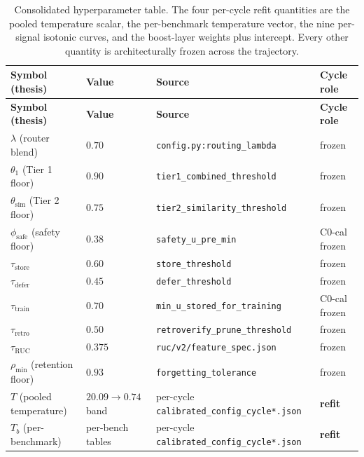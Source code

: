{\footnotesize
\setlength{\tabcolsep}{4pt}
\renewcommand{\arraystretch}{1.1}
\begin{longtable}{@{}p{4.0cm}p{3.8cm}p{4.0cm}p{2.6cm}@{}}
\caption[Consolidated hyperparameter table]{Consolidated hyperparameter table. The four per-cycle refit quantities are the pooled temperature scalar, the per-benchmark temperature vector, the nine per-signal isotonic curves, and the boost-layer weights plus intercept. Every other quantity is architecturally frozen across the trajectory.}
\label{tab:app-hyperparameters}\\
\toprule
\textbf{Symbol (thesis)} & \textbf{Value} & \textbf{Source} & \textbf{Cycle role} \\
\midrule
\endfirsthead
\toprule
\textbf{Symbol (thesis)} & \textbf{Value} & \textbf{Source} & \textbf{Cycle role} \\
\midrule
\endhead
\bottomrule
\endfoot
$\lambda$ (router blend)             & $0.70$ & \texttt{config.py:\allowbreak routing\_lambda} & frozen \\
$\theta_{1}$ (Tier 1 floor)          & $0.90$ & \texttt{tier1\_combined\_\allowbreak threshold} & frozen \\
$\theta_{\text{sim}}$ (Tier 2 floor) & $0.75$ & \texttt{tier2\_similarity\_\allowbreak threshold} & frozen \\
$\phi_{\text{safe}}$ (safety floor)  & $0.38$ & \texttt{safety\_u\_pre\_min} & C0-cal frozen \\
$\tau_{\text{store}}$                & $0.60$ & \texttt{store\_threshold} & frozen \\
$\tau_{\text{defer}}$                & $0.45$ & \texttt{defer\_threshold} & frozen \\
$\tau_{\text{train}}$                & $0.70$ & \texttt{min\_u\_stored\_\allowbreak for\_training} & C0-cal frozen \\
$\tau_{\text{retro}}$                & $0.50$ & \texttt{retroverify\_prune\_\allowbreak threshold} & frozen \\
$\tau_{\text{RUC}}$                  & $0.375$ & \texttt{ruc/v2/\allowbreak feature\_spec.json} & frozen \\
$\rho_{\min}$ (retention floor)      & $0.93$ & \texttt{forgetting\_tolerance} & frozen \\
$T$ (pooled temperature)             & $20.09 \to 0.74$ band & per-cycle \texttt{calibrated\_\allowbreak config\_cycle*.json} & \textbf{refit} \\
$T_{b}$ (per-benchmark)              & per-bench tables       & per-cycle \texttt{calibrated\_\allowbreak config\_cycle*.json} & \textbf{refit} \\

\end{longtable}}
